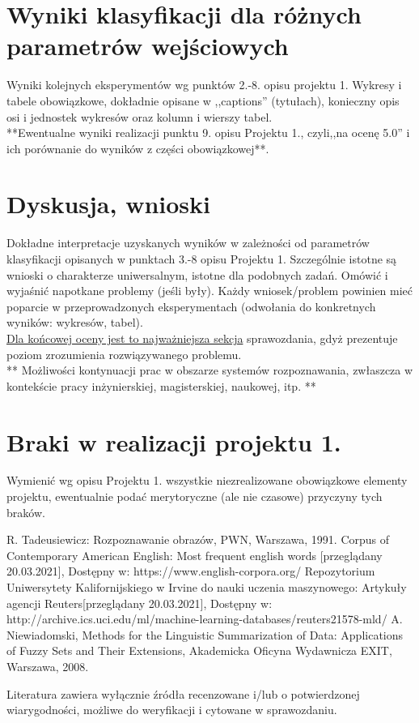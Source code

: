 \documentclass{classrep}
\begin{document}
\section{Wyniki klasyfikacji dla różnych parametrów wejściowych}
Wyniki kolejnych eksperymentów wg punktów 2.-8. opisu projektu 1.  Wykresy i tabele
obowiązkowe, dokładnie opisane w ,,captions'' (tytułach), konieczny opis osi i
jednostek wykresów oraz kolumn i wierszy tabel.\\ 

{**Ewentualne wyniki realizacji punktu 9. opisu Projektu 1., czyli,,na ocenę 5.0'' i ich porównanie do wyników z
części obowiązkowej**.}\\



\section{Dyskusja, wnioski}
Dokładne interpretacje uzyskanych wyników w zależności od parametrów klasyfikacji
opisanych w punktach 3.-8 opisu Projektu 1. 
Szczególnie istotne są wnioski o charakterze uniwersalnym, istotne dla podobnych zadań. 
Omówić i wyjaśnić napotkane problemy (jeśli były). Każdy wniosek/problem powinien mieć poparcie
w przeprowadzonych eksperymentach (odwołania do konkretnych wyników: wykresów,
tabel). \\
\underline{Dla końcowej oceny jest to najważniejsza sekcja} sprawozdania, gdyż prezentuje poziom
zrozumienia rozwiązywanego problemu.\\

** Możliwości kontynuacji prac w obszarze systemów rozpoznawania, zwłaszcza w kontekście pracy inżynierskiej,
magisterskiej, naukowej, itp. **\\



\section{Braki w realizacji projektu 1.}
Wymienić wg opisu Projektu 1. wszystkie niezrealizowane obowiązkowe elementy projektu, ewentualnie
podać merytoryczne (ale nie czasowe) przyczyny tych braków. 


\begin{thebibliography}{0}
 R. Tadeusiewicz: Rozpoznawanie obrazów, PWN, Warszawa, 1991.  
 Corpus of Contemporary American English: Most frequent english words [przeglądany  20.03.2021], Dostępny w: https://www.english-corpora.org/
 Repozytorium Uniwersytety Kalifornijskiego w Irvine do nauki uczenia maszynowego: Artykuły agencji Reuters[przeglądany 20.03.2021], 
Dostępny w: http://archive.ics.uci.edu/ml/machine-learning-databases/reuters21578-mld/
 A. Niewiadomski, Methods for the Linguistic Summarization of Data: Applications of Fuzzy Sets and Their Extensions, Akademicka Oficyna Wydawnicza EXIT, Warszawa, 2008.
\end{thebibliography}

Literatura zawiera wyłącznie źródła recenzowane i/lub o potwierdzonej wiarygodności,
możliwe do weryfikacji i cytowane w sprawozdaniu. 
\end{document}
